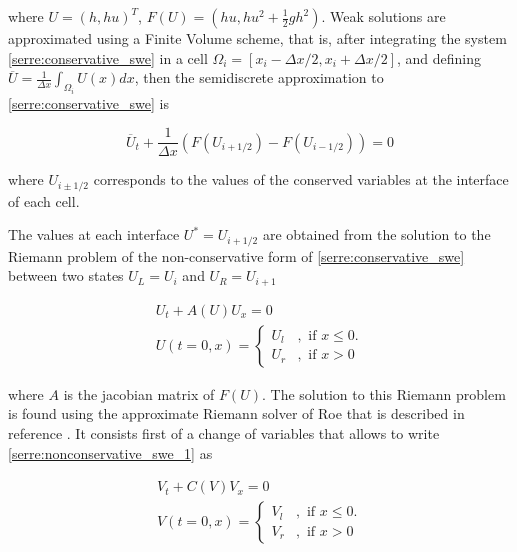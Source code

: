 \noindent where $U=(h,hu)^T$, $F(U) = (hu, hu^2 + \frac{1}{2}gh^2)$. Weak solutions are approximated using a Finite Volume scheme, that is, after integrating the system \eqref{serre:conservative_swe} in a cell $\Omega_i = [x_i-\Delta x/2, x_i+\Delta x/2]$, and defining $ \overline U = \frac{1}{\Delta x} \int_{\Omega_i} U(x)dx$, then the semidiscrete approximation to \eqref{serre:conservative_swe} is 

\begin{equation}
	\overline U _t + \frac{1}{\Delta x}\left( F(U_{i+1/2}) - F(U_{i-1/2}) \right) = 0
\end{equation}

\noindent where $U_{i\pm1/2}$ corresponds to the values of the conserved variables at the interface of each cell. 

The values at each interface $U^* = U_{i+1/2}$ are obtained from the solution to the Riemann problem of the non-conservative form of \eqref{serre:conservative_swe} between two states $U_L = U_i$ and $U_R = U_{i+1}$

\begin{equation}
	\begin{split}
	  U_t + A(U) U_x = 0 \\
	  U(t=0,x) = \begin{cases}
		 U_l &, \text{ if } x\leq 0. \\
		 U_r &, \text{ if } x > 0 
		\end{cases}
	\end{split}
	\label{serre:nonconservative_swe_1}
\end{equation}

\noindent where $A$ is the jacobian matrix of $F(U)$. The solution to this Riemann problem is found using the approximate Riemann solver of Roe that is described in reference \cite{marche2006}. It consists first of a change of variables that allows to write \eqref{serre:nonconservative_swe_1} as

\begin{equation}
	\begin{split}
	  V_t + C(V)V_x = 0 \\
	  V(t=0,x) = \begin{cases}
		V_l &, \text{ if } x\leq 0. \\
	 V_r &, \text{ if } x > 0 
		\end{cases}
	\end{split}
	\label{serre:nonconservative_swe_2}
\end{equation}

